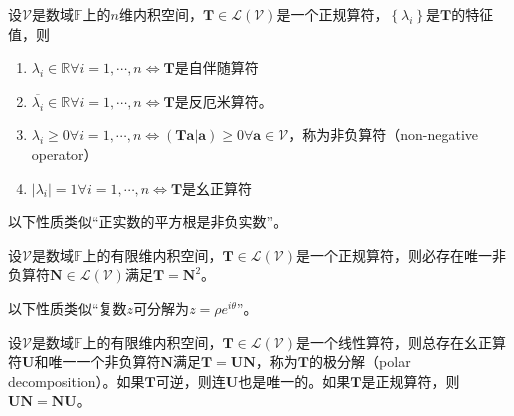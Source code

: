 \documentclass[main.tex]{subfiles}
\begin{document}
\begin{theorem}
设$\mathcal{V}$是数域$\mathbb{F}$上的$n$维内积空间，$\mathbf{T}\in\mathcal{L}\left(\mathcal{V}\right)$是一个正规算符，$\left\{\lambda_i\right\}$是$\mathbf{T}$的特征值，则
\begin{enumerate}
    \item $\lambda_i\in\mathbb{R}\forall i=1,\cdots,n\Leftrightarrow\mathbf{T}$是自伴随算符
    \item $\overline{\lambda_i}\in\mathbb{R}\forall i=1,\cdots,n\Leftrightarrow\mathbf{T}$是反厄米算符。
    \item $\lambda_i\geq 0\forall i=1,\cdots,n\Leftrightarrow\left(\mathbf{Ta}|\mathbf{a}\right)\geq0\forall\mathbf{a}\in\mathcal{V}$，称为非负算符（non-negative operator）
    \item $\left|\lambda_i\right|=1\forall i=1,\cdots,n\Leftrightarrow\mathbf{T}$是幺正算符
\end{enumerate}
\end{theorem}

以下性质类似“正实数的平方根是非负实数”。

\begin{theorem}
设$\mathcal{V}$是数域$\mathbb{F}$上的有限维内积空间，$\mathbf{T}\in\mathcal{L}\left(\mathcal{V}\right)$是一个正规算符，则必存在唯一非负算符$\mathbf{N}\in\mathcal{L}\left(\mathcal{V}\right)$满足$\mathbf{T}=\mathbf{N}^2$。
\end{theorem}

以下性质类似“复数$z$可分解为$z=\rho e^{i\theta}$”。

\begin{theorem}
设$\mathcal{V}$是数域$\mathbb{F}$上的有限维内积空间，$\mathbf{T}\in\mathcal{L}\left(\mathcal{V}\right)$是一个线性算符，则总存在幺正算符$\mathbf{U}$和唯一一个非负算符$\mathbf{N}$满足$\mathbf{T}=\mathbf{UN}$，称为$\mathbf{T}$的极分解（polar decomposition）。如果$\mathbf{T}$可逆，则连$\mathbf{U}$也是唯一的。如果$\mathbf{T}$是正规算符，则$\mathbf{UN}=\mathbf{NU}$。
\end{theorem}
\end{document}
